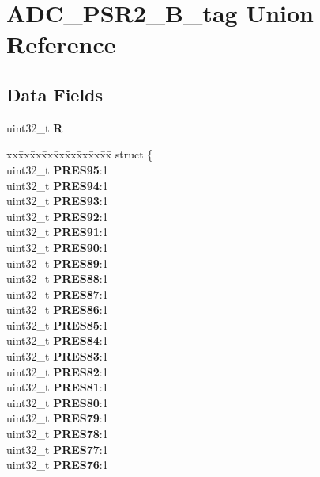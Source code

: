 \hypertarget{unionADC__PSR2__32B__tag}{}\section{A\+D\+C\+\_\+\+P\+S\+R2\+\_\+B\+\_\+tag Union Reference}
\label{unionADC__PSR2__32B__tag}
\subsection*{Data Fields}
\begin{DoxyCompactItemize}
\item 
\mbox{\label{unionADC__PSR2__32B__tag_aadb7001083ed7eeeaaf86a1160d9b995}} 
uint32\+\_\+t {\bfseries R}
\item 
\mbox{\label{unionADC__PSR2__32B__tag_a1297a5e8c4d6a3668b31e0af191a29c1}} 
\begin{tabbing}
xx\=xx\=xx\=xx\=xx\=xx\=xx\=xx\=xx\=\kill
struct \{\\
\>uint32\_t {\bfseries PRES95}:1\\
\>uint32\_t {\bfseries PRES94}:1\\
\>uint32\_t {\bfseries PRES93}:1\\
\>uint32\_t {\bfseries PRES92}:1\\
\>uint32\_t {\bfseries PRES91}:1\\
\>uint32\_t {\bfseries PRES90}:1\\
\>uint32\_t {\bfseries PRES89}:1\\
\>uint32\_t {\bfseries PRES88}:1\\
\>uint32\_t {\bfseries PRES87}:1\\
\>uint32\_t {\bfseries PRES86}:1\\
\>uint32\_t {\bfseries PRES85}:1\\
\>uint32\_t {\bfseries PRES84}:1\\
\>uint32\_t {\bfseries PRES83}:1\\
\>uint32\_t {\bfseries PRES82}:1\\
\>uint32\_t {\bfseries PRES81}:1\\
\>uint32\_t {\bfseries PRES80}:1\\
\>uint32\_t {\bfseries PRES79}:1\\
\>uint32\_t {\bfseries PRES78}:1\\
\>uint32\_t {\bfseries PRES77}:1\\
\>uint32\_t {\bfseries PRES76}:1\\

\end{tabbing}
\end{DoxyCompactItemize}
